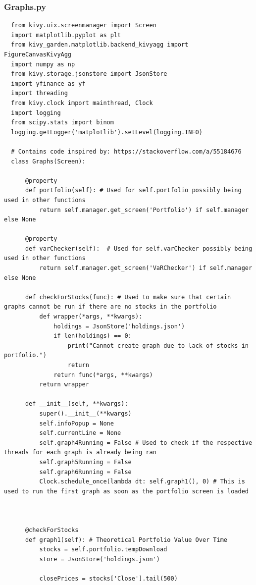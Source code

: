 \documentclass{article}
\begin{document}
\subsubsection{Graphs.py}
\begin{verbatim}
  from kivy.uix.screenmanager import Screen
  import matplotlib.pyplot as plt
  from kivy_garden.matplotlib.backend_kivyagg import FigureCanvasKivyAgg
  import numpy as np
  from kivy.storage.jsonstore import JsonStore
  import yfinance as yf
  import threading
  from kivy.clock import mainthread, Clock
  import logging
  from scipy.stats import binom
  logging.getLogger('matplotlib').setLevel(logging.INFO)

  # Contains code inspired by: https://stackoverflow.com/a/55184676
  class Graphs(Screen):

      @property
      def portfolio(self): # Used for self.portfolio possibly being used in other functions
          return self.manager.get_screen('Portfolio') if self.manager else None
      
      @property
      def varChecker(self):  # Used for self.varChecker possibly being used in other functions
          return self.manager.get_screen('VaRChecker') if self.manager else None
      
      def checkForStocks(func): # Used to make sure that certain graphs cannot be run if there are no stocks in the portfolio
          def wrapper(*args, **kwargs):
              holdings = JsonStore('holdings.json')
              if len(holdings) == 0:
                  print("Cannot create graph due to lack of stocks in portfolio.")
                  return
              return func(*args, **kwargs)
          return wrapper

      def __init__(self, **kwargs):
          super().__init__(**kwargs)
          self.infoPopup = None 
          self.currentLine = None
          self.graph4Running = False # Used to check if the respective threads for each graph is already being ran
          self.graph5Running = False 
          self.graph6Running = False 
          Clock.schedule_once(lambda dt: self.graph1(), 0) # This is used to run the first graph as soon as the portfolio screen is loaded



      @checkForStocks
      def graph1(self): # Theoretical Portfolio Value Over Time
          stocks = self.portfolio.tempDownload
          store = JsonStore('holdings.json')

          closePrices = stocks['Close'].tail(500)
      

\end{verbatim}
\end{document}
